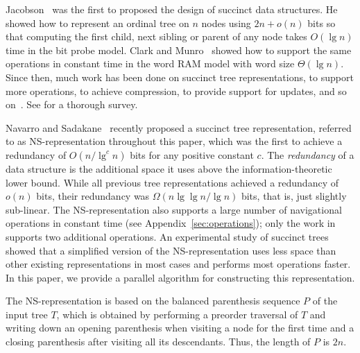 Jacobson~\cite{j1989} was the first to  proposed the design of succinct data
structures.  He showed how to represent an ordinal tree on $n$ nodes
using $2n+o(n)$ bits so that computing the first child, next sibling
or parent of any node takes $O(\lg n)$ time in the bit probe
model.  Clark and Munro~\cite{cm1996} showed how to support the same
operations in constant time in the word RAM model with word size
$\Theta(\lg n)$.  Since then, much work has been done on succinct tree
representations, to support more operations, to achieve compression,
to provide support for updates, and so
on~\cite{mr1997,bdmr1999,grr2004,jss2007,ly2008,hms2012,fm2014,Navarro:2014:FFS:2620785.2601073}.
See \cite{rr2013} for a thorough survey.

Navarro and Sadakane~\cite{Navarro:2014:FFS:2620785.2601073} recently
proposed a succinct tree representation, referred to as
NS-representation throughout this paper, which was the first to
achieve a redundancy of $O(n/\lg^c n)$ bits for any positive constant
$c$.  The \emph{redundancy} of a data structure is the additional
space it uses above the information-theoretic lower bound.  While all
previous tree representations achieved a redundancy of $o(n)$ bits,
their redundancy was $\Omega(n \lg\lg n / \lg n)$ bits, that is, just
slightly sub-linear.  The NS-representation also supports a large
number of navigational operations in constant time (see
Appendix~\ref{sec:operations});
only the work in \cite{hms2012,fm2014} supports two additional operations.
An experimental study of succinct trees~\cite{ACNSalenex10} showed that a
simplified version of the NS-representation uses less space than other
existing representations in most cases and performs most operations
faster.  In this paper, we provide a parallel algorithm for
constructing this representation.

The NS-representation is based on the balanced parenthesis sequence
$P$ of the input tree $T$, which is obtained by performing a preorder
traversal of $T$ and writing down an opening parenthesis when visiting a node
for the first time and a closing parenthesis after visiting all
its descendants.  Thus, the length of $P$ is $2n$.

